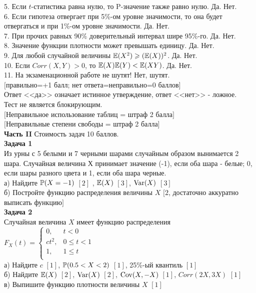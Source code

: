 \documentclass[pdftex,12pt,a4paper]{article}
\begin{document}
5. Если $t$-статистика равна нулю, то P-значение также равно
нулю. Да. Нет. \\

6. Если гипотеза отвергает при 5\%-ом уровне значимости, то
она будет отвергаться и при 1\%-ом уровне значимости. Да. Нет. \\

7. При прочих равных 90\% доверительный интервал шире 95\%-го. Да. Нет. \\

8. Значение функции плотности может превышать единицу. Да. Нет. \\

9. Для любой случайной величины  $\E(X^{2} )\ge
(\E(X))^{2}$. Да. Нет. \\

10. Если $Corr(X,Y)>0$, то $\E(X)\E(Y)<\E(XY)$. Да. Нет. \\

11. На экзаменационной работе не шутят! Нет, шутят. \\


$[$правильно=+1 балл; нет ответа=неправильно=0 баллов$]$ \\
Ответ <<да>> означает истинное утверждение, ответ <<нет>> - ложное. \\
Тест не является блокирующим. \\

$[$Неправильное использование таблиц = штраф 2 балла$]$ \\
$[$Неправильные степени свободы = штраф 2 балла$]$ \\

\pagebreak \textbf{Часть II} Стоимость задач 10 баллов. \\


\textbf{Задача 1} \\ %
Из урны с 5 белыми и 7 черными шарами случайным образом вынимается
2 шара. Случайная величина $Х$ принимает значение (-1), если оба
шара - белые; 0, если шары разного цвета и 1, если оба шара
черные. \\
а) Найдите $\P(X=-1)$ $[2]$ , $\E(X)$ $[3]$, $\Var(X)$ $[3]$ \\
б) Постройте функцию распределения величины $X$ $[2$, достаточно аккуратно выписать функцию$]$ \\



\textbf{Задача 2} \\ %
Случайная величина $X$ имеет функцию распределения
$F_{X}(t)=\left\{\begin{array}{ll}
  0, & t<0 \\
  ct^{2}, & 0\le t <1 \\
  1, & 1\le t \\
\end{array} \right.$ \\
а) Найдите $c$ $[1]$, $\P(0.5<X<2)$ $[1]$, 25\%-ый квантиль $[1]$ \\
б) Найдите $\E(X)$ $[2]$, $\Var(X)$ $[2]$, $\Cov(X,-X)$ $[1]$, $Corr(2X,3X)$ $[1]$ \\
в) Выпишите функцию плотности величины $X$ $[1]$ \\
\end{document}
